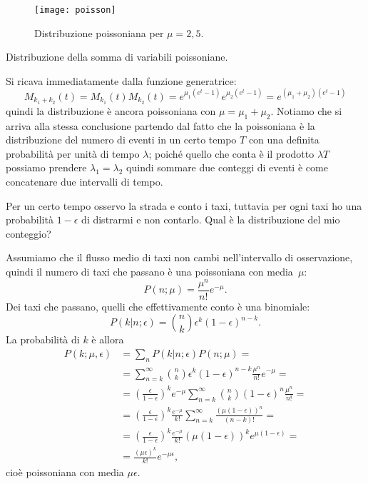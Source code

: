 \begin{figure}
	\centering
	\texttt{[image: poisson]}
	\caption{Distribuzione poissoniana per $\mu=2,5$.}
\end{figure}

\begin{exercise}
	\label{th:sumpoisson}
	Distribuzione della somma di variabili poissoniane.
\end{exercise}

\begin{solution}
	Si ricava immediatamente dalla funzione generatrice:
	\begin{equation*}
		M_{k_1+k_2}(t) =
		M_{k_1}(t)M_{k_2}(t) =
		e^{\mu_1(e^t-1)} e^{\mu_2(e^t-1)} =
		e^{(\mu_1+\mu_2)(e^t-1)}
	\end{equation*}
	quindi la distribuzione è ancora poissoniana con $\mu=\mu_1+\mu_2$.
	Notiamo che si arriva alla stessa conclusione partendo dal fatto che la poissoniana è la distribuzione del numero di eventi in un certo tempo $T$ con una definita probabilità per unità di tempo $\lambda$; poiché quello che conta è il prodotto $\lambda T$ possiamo prendere $\lambda_1=\lambda_2$ quindi sommare due conteggi di eventi è come concatenare due intervalli di tempo.
\end{solution}

\begin{exercise}
	\label{th:taxi}
	Per un certo tempo osservo la strada e conto i taxi,
	tuttavia per ogni taxi ho una probabilità $1-\epsilon$ di distrarmi e
    non contarlo. Qual è la distribuzione del mio conteggio?
\end{exercise}

\begin{solution}
	Assumiamo che il flusso medio di taxi non cambi nell'intervallo di osservazione,
	quindi il numero di taxi che passano è una poissoniana con media~$\mu$:
	\begin{equation*}
		P(n;\mu) = \frac{\mu^n}{n!}e^{-\mu}.
	\end{equation*}
	Dei taxi che passano, quelli che effettivamente conto è una binomiale:
	\begin{equation*}
		P(k|n;\epsilon) = \binom nk \epsilon^k (1-\epsilon)^{n-k}.
	\end{equation*}
	La probabilità di $k$ è allora
	\begin{align*}
		P(k;\mu,\epsilon) &=
		\sum_n P(k|n;\epsilon) P(n;\mu) = \\
		&= \sum_{n=k}^\infty \binom nk \epsilon^k (1-\epsilon)^{n-k} \frac{\mu^n}{n!}e^{-\mu} = \\
		&= \left( \frac\epsilon{1-\epsilon} \right)^k e^{-\mu} \sum_{n=k}^\infty \binom nk (1-\epsilon)^n \frac{\mu^n}{n!} = \\
		&= \left( \frac\epsilon{1-\epsilon} \right)^k \frac{e^{-\mu}}{k!} \sum_{n=k}^\infty \frac{(\mu(1-\epsilon))^n}{(n-k)!} = \\
		&= \left( \frac\epsilon{1-\epsilon} \right)^k \frac{e^{-\mu}}{k!} (\mu(1-\epsilon))^k e^{\mu(1-\epsilon)} = \\
		&= \frac{(\mu\epsilon)^k}{k!}e^{-\mu\epsilon},
	\end{align*}
	cioè poissoniana con media $\mu\epsilon$.
\end{solution}

